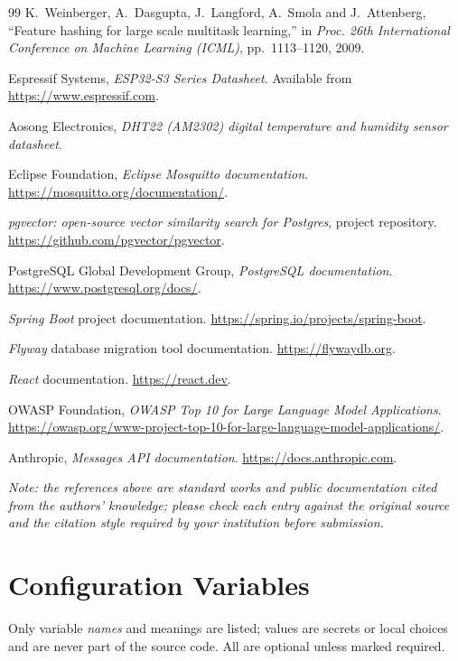 \documentclass[12pt,a4paper,oneside]{report}
\begin{document}
\begin{thebibliography}{99}
 K.~Weinberger, A.~Dasgupta, J.~Langford, A.~Smola and J.~Attenberg, ``Feature hashing for large scale multitask learning,'' in \emph{Proc. 26th International Conference on Machine Learning (ICML)}, pp.~1113--1120, 2009.

 Espressif Systems, \emph{ESP32-S3 Series Datasheet}. Available from \url{https://www.espressif.com}.

 Aosong Electronics, \emph{DHT22 (AM2302) digital temperature and humidity sensor datasheet}.

 Eclipse Foundation, \emph{Eclipse Mosquitto documentation}. \url{https://mosquitto.org/documentation/}.

 \emph{pgvector: open-source vector similarity search for Postgres}, project repository. \url{https://github.com/pgvector/pgvector}.

 PostgreSQL Global Development Group, \emph{PostgreSQL documentation}. \url{https://www.postgresql.org/docs/}.

 \emph{Spring Boot} project documentation. \url{https://spring.io/projects/spring-boot}.

 \emph{Flyway} database migration tool documentation. \url{https://flywaydb.org}.

 \emph{React} documentation. \url{https://react.dev}.

 OWASP Foundation, \emph{OWASP Top 10 for Large Language Model Applications}. \url{https://owasp.org/www-project-top-10-for-large-language-model-applications/}.

 Anthropic, \emph{Messages API documentation}. \url{https://docs.anthropic.com}.

\end{thebibliography}

\medskip
\noindent\textit{Note: the references above are standard works and public documentation cited from the authors' knowledge; please check each entry against the original source and the citation style required by your institution before submission.}

\appendix

\chapter{Configuration Variables}
\label{app:config}
Only variable \emph{names} and meanings are listed; values are secrets or local choices and are never part of the source code. All are optional unless marked required.
\end{document}
